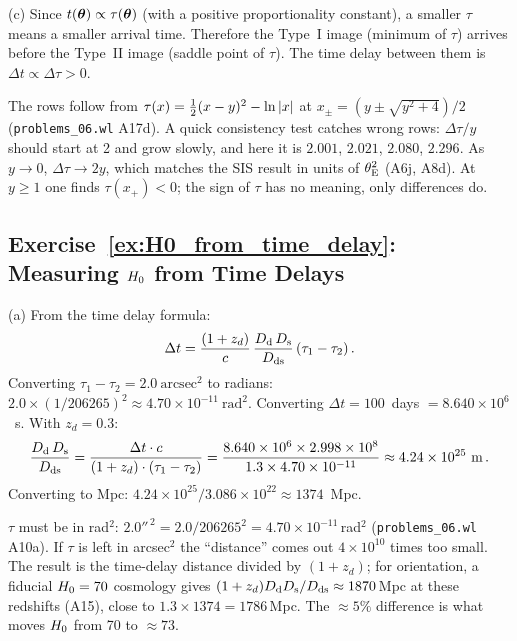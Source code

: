 (c) Since $t(\boldsymbol{\theta}) \propto \tau(\boldsymbol{\theta})$ (with a
positive proportionality constant), a smaller $\tau$ means a smaller
arrival time.  Therefore the Type~I image (minimum of $\tau$) arrives
before the Type~II image (saddle point of $\tau$).  The time delay
between them is $\Delta t \propto \Delta\tau > 0$.

\begin{annotation}
The rows follow from $\tau(x) = \tfrac{1}{2}(x-y)^2-\ln|x|$ at
$x_\pm = (y\pm\sqrt{y^2+4})/2$ (\texttt{problems\_06.wl} A17d).
A quick consistency test catches wrong rows:
$\Delta\tau/y$ should start at 2 and grow slowly, and here it is $2.001$,
$2.021$, $2.080$, $2.296$.  As $y\to0$, $\Delta\tau\to2y$, which matches the
SIS result in units of $\theta_{\mathrm{E}}^2$ (A6j, A8d).  At $y\geq1$ one finds
$\tau(x_+)<0$; the sign of $\tau$ has no meaning, only differences do.
\end{annotation}

\subsection*{Exercise~\ref{ex:H0_from_time_delay}: Measuring $H_0$ from Time Delays}

(a) From the time delay formula:
\begin{equation*}
    \Delta t = \frac{(1 + z_d)}{c}\,
    \frac{D_{\mathrm{d}}\,D_{\mathrm{s}}}{D_{\mathrm{ds}}}\, (\tau_1 - \tau_2) \,.
\end{equation*}
Converting $\tau_1 - \tau_2 = 2.0~\text{arcsec}^2$ to radians:
$2.0 \times (1/206265)^2 \approx 4.70 \times 10^{-11}~\text{rad}^2$.
Converting $\Delta t = 100$~days $= 8.640 \times 10^6$~s.
With $z_d = 0.3$:
\begin{equation*}
    \frac{D_{\mathrm{d}}\,D_{\mathrm{s}}}{D_{\mathrm{ds}}}
    = \frac{\Delta t \cdot c}{(1 + z_d) \cdot (\tau_1 - \tau_2)}
    = \frac{8.640 \times 10^6 \times 2.998 \times 10^8}
    {1.3 \times 4.70 \times 10^{-11}}
    \approx 4.24 \times 10^{25}~\text{m} \,.
\end{equation*}
Converting to Mpc: $4.24 \times 10^{25} / 3.086 \times 10^{22}
\approx 1374$~Mpc.

\begin{annotation}[Units in (a)]
$\tau$ must be in rad$^2$: $2.0''^{\,2} = 2.0/206265^2 = 4.70\times10^{-11}$\,rad$^2$
(\texttt{problems\_06.wl} A10a).  If $\tau$ is left in arcsec$^2$ the
``distance'' comes out $4\times10^{10}$ times too small.  The result is the
time-delay distance divided by $(1+z_d)$; for orientation, a fiducial
$H_0=70$ cosmology gives $(1+z_d)D_{\mathrm{d}}D_{\mathrm{s}}/D_{\mathrm{ds}}\approx1870$\,Mpc at these
redshifts (A15), close to $1.3\times1374 = 1786$\,Mpc.  The $\approx5\%$
difference is what moves $H_0$ from 70 to $\approx73$.
\end{annotation}

